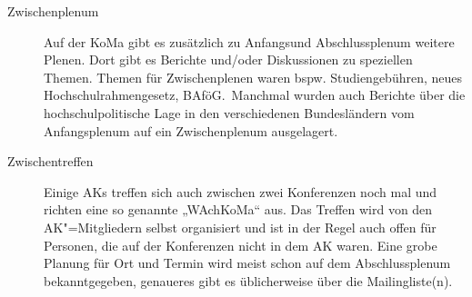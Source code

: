 \begin{description}
\item[Zwischenplenum] Auf der KoMa gibt es zusätzlich zu Anfangsund
	Abschlussplenum weitere Plenen. Dort gibt es Berichte und/oder Diskussionen
	zu speziellen Themen. Themen für Zwischenplenen waren bspw.
	Studiengebühren, neues Hochschulrahmengesetz, BAföG.\ Manchmal wurden auch
	Berichte über die hochschulpolitische Lage in den verschiedenen
	Bundesländern vom Anfangsplenum auf ein Zwischenplenum ausgelagert.

\item[Zwischentreffen] Einige AKs treffen sich auch zwischen zwei Konferenzen
	noch mal und richten eine so genannte „WAchKoMa“ aus. Das Treffen wird von
	den AK"=Mitgliedern selbst organisiert und ist in der Regel auch offen für
	Personen, die auf der Konferenzen nicht in dem AK waren.  Eine grobe
	Planung für Ort und Termin wird meist schon auf dem Abschlussplenum
	bekanntgegeben, genaueres gibt es üblicherweise über die Mailingliste(n).
\end{description}
